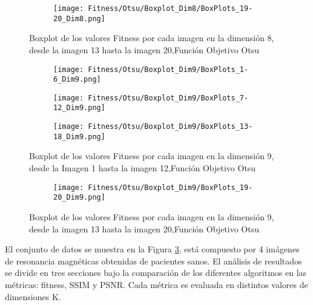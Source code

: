 \documentclass[conference]{IEEEtran}
\begin{document}
\begin{figure}
    \centering
    \begin{subfigure}{0.5\textwidth}
        \texttt{[image: Fitness/Otsu/Boxplot\_Dim8/BoxPlots\_19-20\_Dim8.png]}
        \vspace{-150pt} %
    \end{subfigure}
    \caption{Boxplot de los valores Fitness por cada imagen en la dimensión 8, desde la imagen 13 hasta la imagen 20,Función Objetivo Otsu}
    \label{fig:imagenes}    
\end{figure}
\begin{figure}
    \centering

    \begin{subfigure}{0.5\textwidth}
        \texttt{[image: Fitness/Otsu/Boxplot\_Dim9/BoxPlots\_1-6\_Dim9.png]}
    \end{subfigure}
    
    \begin{subfigure}{0.5\textwidth}
        \texttt{[image: Fitness/Otsu/Boxplot\_Dim9/BoxPlots\_7-12\_Dim9.png]}
    \end{subfigure}
         \begin{subfigure}{0.5\textwidth}
        \texttt{[image: Fitness/Otsu/Boxplot\_Dim9/BoxPlots\_13-18\_Dim9.png]}
    \end{subfigure}
    \caption{Boxplot de los valores Fitness por cada imagen en la dimensión 9, desde la Imagen 1 hasta la imagen 12,Función Objetivo Otsu}
\label{fig:imagenes}    
\end{figure}

\begin{figure}
    \centering
    \begin{subfigure}{0.5\textwidth}
        \texttt{[image: Fitness/Otsu/Boxplot\_Dim9/BoxPlots\_19-20\_Dim9.png]}
        \vspace{-150pt} %
    \end{subfigure}
    \caption{Boxplot de los valores Fitness por cada imagen en la dimensión 9, desde la imagen 13 hasta la imagen 20,Función Objetivo Otsu}
    \label{fig:imagenes}    
\end{figure}





\noindent El conjunto de datos se muestra en la Figura \ref{fig:imagenes}, está compuesto por 4 imágenes de resonancia magnéticas obtenidas de pacientes sanos. 
El análisis de resultados se divide en tres secciones bajo la comparación de los diferentes algoritmos en las métricas: fitness, SSIM y PSNR. Cada métrica es evaluada en distintos valores de dimensiones K.
\end{document}
